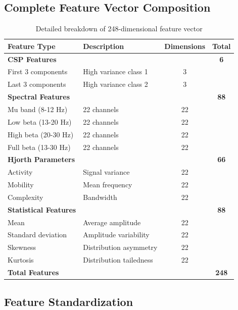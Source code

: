 \documentclass[11pt]{article}
\begin{document}
\subsection{Complete Feature Vector Composition}

\begin{table}[H]
\centering
\caption{Detailed breakdown of 248-dimensional feature vector}
\begin{tabular}{@{}llcc@{}}
\toprule
\textbf{Feature Type} & \textbf{Description} & \textbf{Dimensions} & \textbf{Total} \\
\midrule
\textbf{CSP Features} & & & \textbf{6} \\
\quad First 3 components & High variance class 1 & 3 & \\
\quad Last 3 components & High variance class 2 & 3 & \\
\midrule
\textbf{Spectral Features} & & & \textbf{88} \\
\quad Mu band (8-12 Hz) & 22 channels & 22 & \\
\quad Low beta (13-20 Hz) & 22 channels & 22 & \\
\quad High beta (20-30 Hz) & 22 channels & 22 & \\
\quad Full beta (13-30 Hz) & 22 channels & 22 & \\
\midrule
\textbf{Hjorth Parameters} & & & \textbf{66} \\
\quad Activity & Signal variance & 22 & \\
\quad Mobility & Mean frequency & 22 & \\
\quad Complexity & Bandwidth & 22 & \\
\midrule
\textbf{Statistical Features} & & & \textbf{88} \\
\quad Mean & Average amplitude & 22 & \\
\quad Standard deviation & Amplitude variability & 22 & \\
\quad Skewness & Distribution asymmetry & 22 & \\
\quad Kurtosis & Distribution tailedness & 22 & \\
\midrule
\textbf{Total Features} & & & \textbf{248} \\
\bottomrule
\end{tabular}
\end{table}

\subsection{Feature Standardization}
\end{document}
